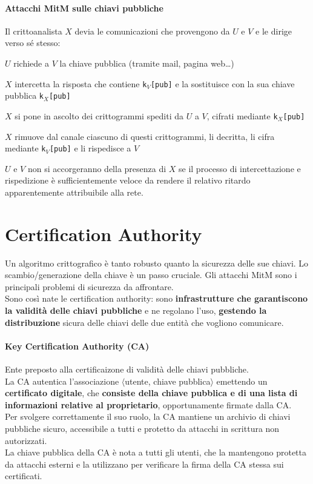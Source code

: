\documentclass[10pt]{book}
\begin{document}
\paragraph{Attacchi MitM sulle chiavi pubbliche} Il crittoanalista $X$ devia le comunicazioni che provengono da $U$ e $V$ e le dirige verso sé stesso:
\begin{list}{}{}
	\item $U$ richiede a $V$ la chiave pubblica (tramite mail, pagina web\ldots)
	\item $X$ intercetta la risposta che contiene \texttt{k$_V$[pub]} e la sostituisce con la sua chiave pubblica \texttt{k$_X$[pub]}
	\item $X$ si pone in ascolto dei crittogrammi spediti da $U$ a $V$, cifrati mediante \texttt{k$_X$[pub]}
	\item $X$ rimuove dal canale ciascuno di questi crittogrammi, li decritta, li cifra mediante \texttt{k$_V$[pub]} e li rispedisce a $V$
	\item $U$ e $V$ non si accorgeranno della presenza di $X$ se il processo di intercettazione e rispedizione è sufficientemente veloce da rendere il relativo ritardo apparentemente attribuibile alla rete.
\end{list}
\section{Certification Authority}
Un algoritmo crittografico è tanto robusto quanto la sicurezza delle sue chiavi. Lo scambio/generazione della chiave è un passo cruciale. Gli attacchi MitM sono i principali problemi di sicurezza da affrontare.\\
Sono così nate le certification authority: sono \textbf{infrastrutture che garantiscono la validità delle chiavi pubbliche} e ne regolano l'uso, \textbf{gestendo la distribuzione} sicura delle chiavi delle due entità che vogliono comunicare.
\paragraph{Key Certification Authority (CA)} Ente preposto alla certificaizone di validità delle chiavi pubbliche.\\
La CA autentica l'associazione $\langle$utente, chiave pubblica$\rangle$ emettendo un \textbf{certificato digitale}, che \textbf{consiste della chiave pubblica e di una lista di informazioni relative al proprietario}, opportunamente firmate dalla CA.\\
Per svolgere correttamente il suo ruolo, la CA mantiene un archivio di chiavi pubbliche sicuro, accessibile a tutti e protetto da attacchi in scrittura non autorizzati.\\
La chiave pubblica della CA è nota a tutti gli utenti, che la mantengono protetta da attacchi esterni e la utilizzano per verificare la firma della CA stessa sui certificati.
\end{document}
